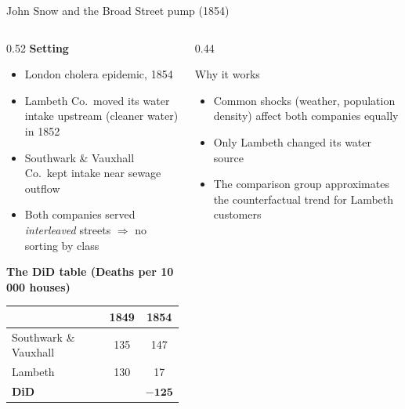 \documentclass[aspectratio=169, 10pt]{beamer}
\begin{document}
\begin{frame}[shrink=5]{John Snow and the Broad Street pump (1854)}

  \begin{columns}[T]
    \begin{column}{0.52\textwidth}
      \textbf{Setting}
      \begin{itemize}
        \item London cholera epidemic, 1854
        \item Lambeth Co.\ moved its water intake upstream (cleaner water) in 1852
        \item Southwark \& Vauxhall Co.\ kept intake near sewage outflow
        \item Both companies served \emph{interleaved} streets $\Rightarrow$ no sorting by class
      \end{itemize}
      \bigskip
      \textbf{The DiD table (Deaths per 10\,000 houses)} \small
      \begin{center}
      \begin{tabular}{lcc}
        \toprule
         & 1849 & 1854 \\
        \midrule
        Southwark \& Vauxhall & 135 & 147 \\
        Lambeth               & 130 &  17 \\
        \midrule
        \textbf{DiD}          &     & $\mathbf{-125}$ \\
        \bottomrule
      \end{tabular}
      \end{center} 
    \end{column}
    \begin{column}{0.44\textwidth}
      \begin{block}{Why it works}
        \begin{itemize}
          \item Common shocks (weather, population density) affect both companies equally
          \item Only Lambeth changed its water source
          \item The comparison group approximates the counterfactual trend for Lambeth customers
        \end{itemize}
      \end{block}
    \end{column}
  \end{columns}

\end{frame}
\end{document}
